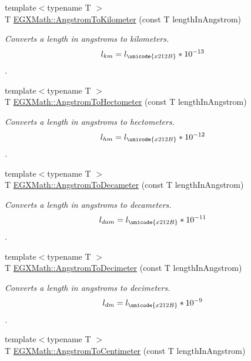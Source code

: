 \begin{DoxyCompactItemize}
{\footnotesize template$<$typename T $>$ }\\T \mbox{\hyperlink{group___e_g_x_math-_conversions-_length_conversions-_non-_s_i-_angstrom-_s_i_gaff245672bc645b3b4a1d181669a3631e}{E\+G\+X\+Math\+::\+Angstrom\+To\+Kilometer}} (const T length\+In\+Angstrom)
\begin{DoxyCompactList}\small\item\em Converts a length in angstroms to kilometers. \[ l_{km}=l_{\unicode{x212B}} * 10^{-13} \]. \end{DoxyCompactList}\item 
{\footnotesize template$<$typename T $>$ }\\T \mbox{\hyperlink{group___e_g_x_math-_conversions-_length_conversions-_non-_s_i-_angstrom-_s_i_ga0f6fad35867be49511009edfdb4b7a0a}{E\+G\+X\+Math\+::\+Angstrom\+To\+Hectometer}} (const T length\+In\+Angstrom)
\begin{DoxyCompactList}\small\item\em Converts a length in angstroms to hectometers. \[ l_{hm}=l_{\unicode{x212B}} * 10^{-12} \]. \end{DoxyCompactList}\item 
{\footnotesize template$<$typename T $>$ }\\T \mbox{\hyperlink{group___e_g_x_math-_conversions-_length_conversions-_non-_s_i-_angstrom-_s_i_gad6c324d7dcb665375853d7ee463bfdbc}{E\+G\+X\+Math\+::\+Angstrom\+To\+Decameter}} (const T length\+In\+Angstrom)
\begin{DoxyCompactList}\small\item\em Converts a length in angstroms to decameters. \[ l_{dam}=l_{\unicode{x212B}} * 10^{-11} \]. \end{DoxyCompactList}\item 
{\footnotesize template$<$typename T $>$ }\\T \mbox{\hyperlink{group___e_g_x_math-_conversions-_length_conversions-_non-_s_i-_angstrom-_s_i_ga66b9d49fe6c0224b619d1c53e43acd23}{E\+G\+X\+Math\+::\+Angstrom\+To\+Decimeter}} (const T length\+In\+Angstrom)
\begin{DoxyCompactList}\small\item\em Converts a length in angstroms to decimeters. \[ l_{dm}=l_{\unicode{x212B}} * 10^{-9} \]. \end{DoxyCompactList}\item 
{\footnotesize template$<$typename T $>$ }\\T \mbox{\hyperlink{group___e_g_x_math-_conversions-_length_conversions-_non-_s_i-_angstrom-_s_i_gac4071068c7a0cfddbf572aab3be97f7b}{E\+G\+X\+Math\+::\+Angstrom\+To\+Centimeter}} (const T length\+In\+Angstrom)

\end{DoxyCompactItemize}

